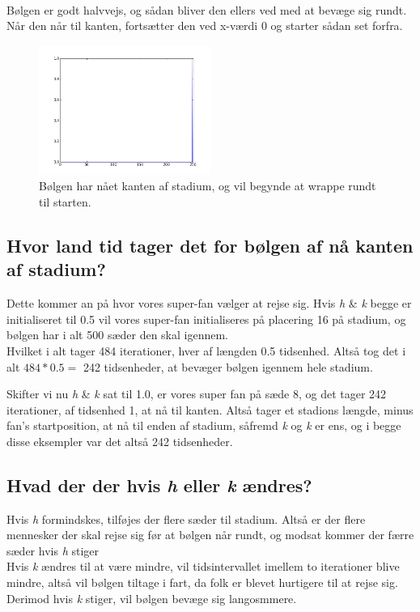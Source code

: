 \documentclass[11pt]{article} %
\begin{document}
\\
Bølgen er godt halvvejs, og sådan bliver den ellers ved med at bevæge sig rundt. Når den når til kanten, fortsætter den ved x-værdi 0 og starter sådan set forfra.
\\
\begin{figure}[h!]
\centering
   \includegraphics[width=0.5\textwidth]{slut}
  \caption{Bølgen har nået kanten af stadium, og vil begynde at wrappe rundt til starten.}
\end{figure}

\subsection*{Hvor land tid tager det for bølgen af nå kanten af stadium?}
Dette kommer an på hvor vores super-fan vælger at rejse sig. Hvis \textit{h} \& \textit{k} begge er initialiseret til 0.5
vil vores super-fan initialiseres på placering 16 på stadium, og bølgen har i alt 500 sæder den skal igennem.\\
Hvilket i alt tager 484 iterationer, hver af længden 0.5 tidsenhed. Altså tog det i alt \begin{math}484*0.5=\end{math} 242 tidsenheder, at bevæger bølgen igennem
hele stadium.

Skifter vi nu \textit{h} \& \textit{k} sat til 1.0, er vores super fan på sæde 8, og det tager 242 iterationer, af tidsenhed 1, at nå til kanten.
Altså tager et stadions længde, minus fan's startposition, at nå til enden af stadium, såfremd \textit{k} og \textit{k} er ens, og i begge disse eksempler var det altså 242 tidsenheder.

\subsection*{Hvad der der hvis \textit{h} eller \textit{k} ændres?}
Hvis \textit{h} formindskes, tilføjes der flere sæder til stadium. Altså er der flere mennesker der skal rejse sig før at bølgen når rundt, og modsat kommer der færre sæder hvis \textit{h} stiger\\
Hvis \textit{k} ændres til at være mindre, vil tidsintervallet imellem to iterationer blive mindre, altså vil bølgen tiltage i fart, da folk er blevet hurtigere til at rejse sig. Derimod hvis \textit{k} stiger, vil bølgen bevæge sig langosmmere.
\end{document}
